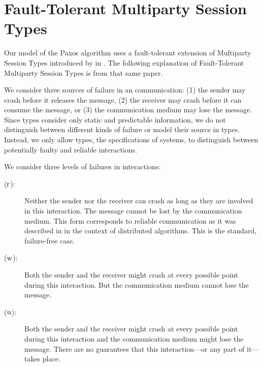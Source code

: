 \section{Fault-Tolerant Multiparty Session Types}
Our model of the Paxos algorithm uses a fault-tolerant extension of Multiparty Session Types introduced by \citeauthor{PetersEtal21} in \cite{PetersEtal21}.
The following explanation of Fault-Tolerant Multiparty Session Types is from that same paper.

We consider three sources of failure in an \unrel communication:
(1) the sender may crash before it releases the message,
(2) the receiver may crash before it can consume the message, or
(3) the communication medium may lose the message.
Since types consider only static and predictable information, we do not distinguish between different kinds of failure or model their source in types.
Instead, we only allow types, \ie the specifications of systems, to distinguish between potentially faulty and reliable interactions.

We consider three levels of failures in interactions:
\begin{description}
	\item[\StrongR ($ \operatorname{r} $):] Neither the sender nor the receiver can crash as long as they are involved in this interaction. The message cannot be lost by the communication medium. This form corresponds to reliable communication as it was described in \cite{AguileraChenToueg97} in the context of distributed algorithms.
		This is the standard, failure-free case.
	\item[\WeakR ($ \operatorname{w} $):] Both the sender and the receiver might crash at every possible point during this interaction. But the communication medium cannot lose the message.
	\item[\Unrel ($ \operatorname{u} $):] Both the sender and the receiver might crash at every possible point during this interaction and the communication medium might lose the message. There are no guarantees that this interaction---or any part of it---takes place.
\end{description}



